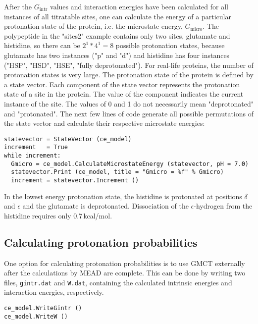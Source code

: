 \documentclass[a4paper,11pt]{article}
\begin{document}
After the $G_{\mathrm{intr}}$ values and interaction energies have been calculated 
for all instances of all titratable sites, 
one can calculate the energy of a particular protonation state of the protein, i.e. 
the microstate energy, $G_{\mathrm{micro}}$.
%
The polypeptide in the "sites2" example contains only two sites, 
glutamate and histidine,
so there can be $2^1 * 4^1 = 8$ possible protonation states, because glutamate has two
instances ("p" and "d") and histidine has four instances ("HSP", "HSD", "HSE", "fully deprotonated").
%
For real-life proteins, the number of protonation states is very large.
%
The protonation state of the protein is defined by a state vector.
%
Each component of the state vector represents the protonation state of a site in the protein.
%
The value of the component indicates the current instance of the site.
%
The values of 0 and 1 do not necessarily mean "deprotonated" and "protonated".
%
The next few lines of code generate all possible permutations of the state vector and calculate
their respective microstate energies:

{\footnotesize \begin{lstlisting}
statevector = StateVector (ce_model)
increment   = True
while increment:
  Gmicro = ce_model.CalculateMicrostateEnergy (statevector, pH = 7.0)
  statevector.Print (ce_model, title = "Gmicro = %f" % Gmicro)
  increment = statevector.Increment ()
\end{lstlisting} }

\bigskip
In the lowest energy protonation state, the histidine is protonated at 
positions $\delta$ and $\epsilon$ and the glutamate is deprotonated.
%
Dissociation of the $\epsilon$-hydrogen from the histidine requires only 0.7\,kcal/mol.


\subsection{Calculating protonation probabilities}
One option for calculating protonation probabilities is to use GMCT externally after 
the calculations by MEAD are complete.
%
This can be done by writing two files, \texttt{gintr.dat} and \texttt{W.dat}, containing 
the calculated intrinsic energies and interaction energies, respectively.

{\footnotesize \begin{lstlisting}
ce_model.WriteGintr ()
ce_model.WriteW ()
\end{lstlisting} }
\end{document}
